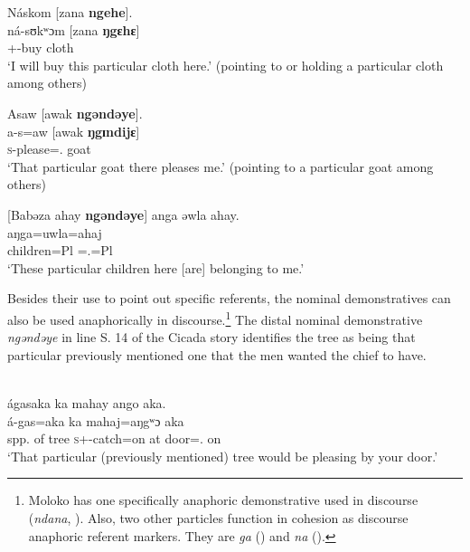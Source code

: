 \ea \label{ex:3:46}
Náskom  [zana \textbf{ngehe}].\\
\gll  ná-sʊkʷɔm  [zana  \textbf{ŋgɛhɛ}]\\
      {\oneS}+{\IFV}-buy  cloth  {\DEM}\\
\glt  ‘I will buy this particular cloth here.’ (pointing to or holding a particular cloth among others)
\z

\ea \label{ex:3:47}
Asaw  [awak \textbf{ngəndəye}].\\
\gll  a-s=aw    [awak  \textbf{ŋgɪndijɛ}]\\
      \textsc{s}-please={\oneS}.{\IO}  goat  {\DEM}\\
\glt  ‘That particular goat there pleases me.’ (pointing to a particular goat among others)
\z

\clearpage
\ea \label{ex:3:48}
[Babəza  ahay  \textbf{ngəndəye}]  anga  əwla  ahay.\\
\gll  [babəza=ahaj   \textbf{ŋgɪndijɛ}]  aŋga=uwla=ahaj\\
      children=Pl  {\DEM}     {\POSS}={\oneS}.{\POSS}=Pl  \\
\glt  ‘These particular children here [are] belonging to me.’ 
\z

Besides their use to point out specific referents, the nominal demonstratives can also be used anaphorically in discourse.\footnote{Moloko has one specifically anaphoric demonstrative used in discourse (\textit{ndana}, ). Also, two other particles function in cohesion as discourse anaphoric referent markers. They are \textit{ga} () and \textit{na} ().} The distal nominal demonstrative \textit{ngəndəye} in line S. 14 of the Cicada story  identifies the tree as being that particular previously mentioned one that the men wanted the chief to have. 

\ea\label{ex:3:49}\\  ágasaka  ka  mahay  ango  aka.\\
  á-gas=aka  ka  mahaj=aŋgʷɔ    aka\\
      {spp. of tree}  {\DEM}              \textsc{s}+{\IFV}-catch=on    at    door={\twoS}.{\POSS}  on\\
\glt  ‘That particular (previously mentioned) tree would be pleasing by your door.’ 
\z

